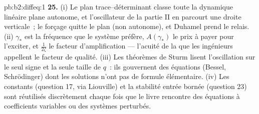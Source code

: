 \begin{solution}{pb:b2:diffeq:1}
\textbf{25.} (i) Le plan trace--déterminant classe toute la
dynamique linéaire plane autonome, et l'oscillateur de la partie II
en parcourt une droite verticale~; le forçage quitte le plan
(non autonome), et Duhamel prend le relais. (ii) $\gamma_*$ est
la fréquence que le système préfère, $A(\gamma_*)$ le prix à payer
pour l'exciter, et $\frac{1}{2\zeta}$ le facteur d'amplification
--- l'acuité de la  que les ingénieurs appellent le
facteur de qualité. (iii) Les théorèmes de Sturm lisent
l'oscillation sur le seul signe et la seule taille de $q$~: ils
gouvernent des équations (Bessel, Schrödinger) dont les solutions
n'ont pas de formule élémentaire. (iv) Les  constants
(question 17, via Liouville) et la stabilité entrée bornée
(question 23) sont réutilisés discrètement chaque fois que le livre
rencontre des équations à coefficients variables ou des systèmes
perturbés.
\end{solution}
